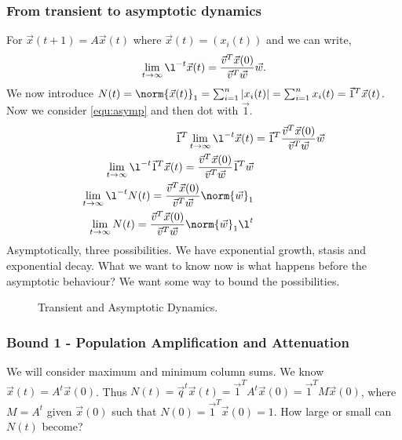 \subsubsection{From transient to asymptotic dynamics}
For $\vec x(t + 1) = A\vec x(t)$ where $\vec x(t) = (x_i(t))$ and we can write,
\begin{equation}
  \lim_{t\to \infty} \l^{-t}\vec x(t) = \frac{\vec v^T\vec x(0)}{\vec v^T \vec w}\vec w.\label{equ:asymp}
\end{equation}
We now introduce $N(t) = \norm{\vec x(t)}_1 = \sum_{i=1}^n |x_i(t)| = \sum_{i=1}^n x_i(t) = \vec 1^T \vec x(t)$. Now we consider \ref{equ:asymp} and then dot with $\vec 1$.
\begin{align*}
  \vec 1^T \lim_{t\to \infty} \l^{-t}\vec x(t) &= \vec 1^T \frac{\vec v^T\vec x(0)}{\vec v^T \vec w}\vec w\\
  \lim_{t\to \infty} \l^{-t}\vec 1^T \vec x(t) = \frac{\vec v^T \vec x(0)}{\vec v^T \vec w}\vec 1^T \vec w \\
  \lim_{t\to \infty} \l^{-t}N(t) = \frac{\vec v^T \vec x(0)}{\vec v^T \vec w}\norm{\vec w}_1 \\
  \lim_{t\to \infty} N(t) = \frac{\vec v^T \vec x(0)}{\vec v^T \vec w}\norm{\vec w}_1 \l^t \\
\end{align*}
Asymptotically, three possibilities. We have exponential growth, stasis and exponential decay. What we want to know now is what happens before the asymptotic behaviour? We want some way to bound the possibilities.
\begin{figure}[!ht]
\centering
\resizebox{0.48\textwidth}{!}{}
\caption{Transient and Asymptotic Dynamics.}
\end{figure}
\noindent

\subsubsection{Bound 1 - Population Amplification and Attenuation}
We will consider maximum and minimum column sums. We know $\vec x(t) = A^t \vec x(0)$. Thus $N(t) = \vec q^t \vec x(t) = \vec 1^T A^t \vec x(0) = \vec 1^T M \vec x(0)$, where $M = A^t$ given $\vec x(0)$ such that $N(0) = \vec 1^T \vec x(0) = 1$. How large or small can $N(t)$ become? \\


